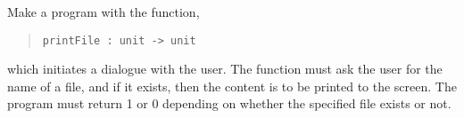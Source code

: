 Make a program with the function,
\begin{quote}
  \mbox{\lstinline!printFile : unit -> unit!}
\end{quote}
which initiates a dialogue with the user. The function must ask the
user for the name of a file, and if it exists, then the content is to
be printed to the screen. The program must return 1 or 0 depending on
whether the specified file exists or not.

